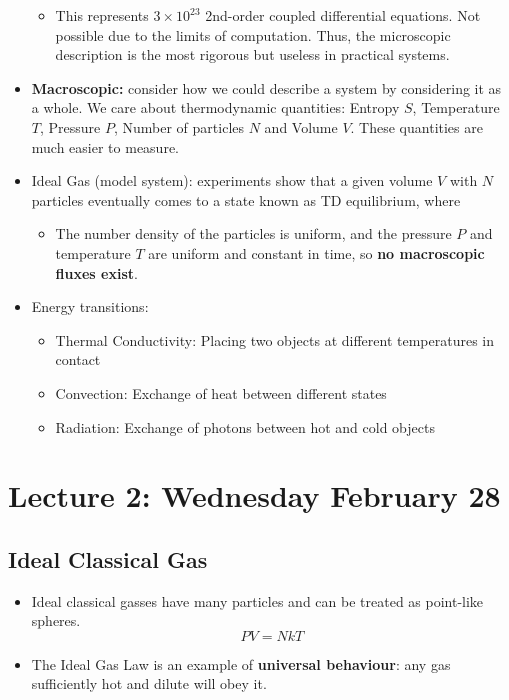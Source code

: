 \documentclass[8pt]{article}
\begin{document}
\begin{itemize}
    \begin{itemize}
        \item This represents $3\times 10^{23}$ 2nd-order coupled differential equations. Not possible due to the limits of computation. Thus, the microscopic description is the most rigorous but useless in practical systems.
    \end{itemize}
    \item \textbf{Macroscopic:} consider how we could describe a system by considering it as a whole. We care about thermodynamic quantities: Entropy $S$, Temperature $T$, Pressure $P$, Number of particles $N$ and Volume $V$. These quantities are much easier to measure. 
    \item Ideal Gas (model system): experiments show that a given volume $V$ with $N$ particles eventually comes to a state known as TD equilibrium, where
    \begin{itemize}
        \item The number density of the particles is uniform, and the pressure $P$ and temperature $T$ are uniform and constant in time, so \textbf{no macroscopic fluxes exist}. 
    \end{itemize}
    \item Energy transitions: 
    \begin{itemize}
        \item Thermal Conductivity: Placing two objects at different temperatures in contact 
        \item Convection: Exchange of heat between different states 
        \item Radiation: Exchange of photons between hot and cold objects
    \end{itemize}
\end{itemize}

\section{Lecture 2: Wednesday February 28}
\subsection{Ideal Classical Gas}
\begin{itemize}
    \item Ideal classical gasses have many particles and can be treated as point-like spheres. 
    \begin{equation}
        PV = NkT
    \end{equation}
    \item The Ideal Gas Law is an example of \textbf{universal behaviour}: any gas sufficiently hot and dilute will obey it.

\end{itemize}
\end{document}
